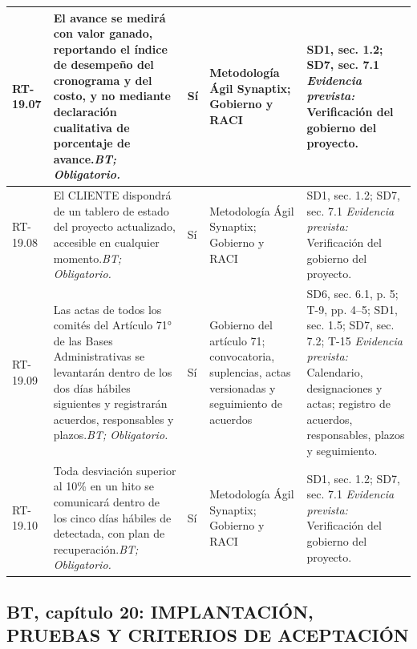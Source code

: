 \begin{paginaHorizontalSynaptix}
\begin{longtable}{|L{0.09\AnchoMatrizTDoce}|L{0.385\AnchoMatrizTDoce}|L{0.065\AnchoMatrizTDoce}|L{0.18\AnchoMatrizTDoce}|L{0.28\AnchoMatrizTDoce}|}
RT-\allowbreak{}19.\allowbreak{}07 &
El avance se medirá con valor ganado, reportando el índice de desempeño del cronograma y del costo, y no mediante declaración cualitativa de porcentaje de avance.\newline\textit{BT; Obligatorio.} &
Sí &
Metodología Ágil Synaptix; Gobierno y RACI &
SD1, sec. 1.2; SD7, sec. 7.1 \newline\textit{Evidencia prevista:} Verificación del gobierno del proyecto. \\ \hline

RT-\allowbreak{}19.\allowbreak{}08 &
El CLIENTE dispondrá de un tablero de estado del proyecto actualizado, accesible en cualquier momento.\newline\textit{BT; Obligatorio.} &
Sí &
Metodología Ágil Synaptix; Gobierno y RACI &
SD1, sec. 1.2; SD7, sec. 7.1 \newline\textit{Evidencia prevista:} Verificación del gobierno del proyecto. \\ \hline

RT-\allowbreak{}19.\allowbreak{}09 &
Las actas de todos los comités del Artículo 71° de las Bases Administrativas se levantarán dentro de los dos días hábiles siguientes y registrarán acuerdos, responsables y plazos.\newline\textit{BT; Obligatorio.} &
Sí &
Gobierno del artículo 71; convocatoria, suplencias, actas versionadas y seguimiento de acuerdos &
SD6, sec. 6.1, p. 5; T-9, pp. 4--5; SD1, sec. 1.5; SD7, sec. 7.2; T-15 \newline\textit{Evidencia prevista:} Calendario, designaciones y actas; registro de acuerdos, responsables, plazos y seguimiento. \\ \hline

RT-\allowbreak{}19.\allowbreak{}10 &
Toda desviación superior al 10\% en un hito se comunicará dentro de los cinco días hábiles de detectada, con plan de recuperación.\newline\textit{BT; Obligatorio.} &
Sí &
Metodología Ágil Synaptix; Gobierno y RACI &
SD1, sec. 1.2; SD7, sec. 7.1 \newline\textit{Evidencia prevista:} Verificación del gobierno del proyecto. \\ \hline

\end{longtable}


\subsection*{BT, capítulo 20: IMPLANTACIÓN, PRUEBAS Y CRITERIOS DE ACEPTACIÓN}


\end{paginaHorizontalSynaptix}
